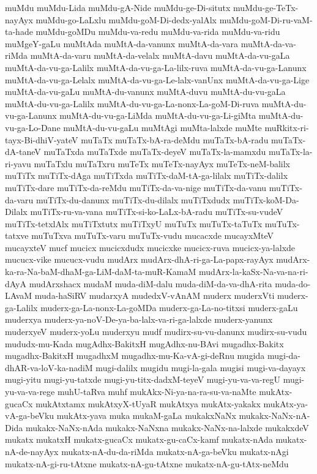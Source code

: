 {muMdu
muMdu-Lida
muMdu-gA-Nide
muMdu-ge-Di-situtx
muMdu-ge-TeTx-nayAyx
muMdu-go-LaLxlu
muMdu-goM-Di-dedx-yalAlx
muMdu-goM-Di-ru-vaM-ta-hade
muMdu-goMDu
muMdu-va-redu
muMdu-va-rida
muMdu-va-ridu
muMgeY-gaLu
muMtAda
muMtA-da-vanunx
muMtA-da-vara
muMtA-da-va-riMda
muMtA-da-varu
muMtA-da-velalx
muMtA-davu
muMtA-da-vu-gaLa
muMtA-da-vu-ga-Lalilx
muMtA-da-vu-ga-La-lilx-ruva
muMtA-da-vu-ga-Lanunx
muMtA-da-vu-ga-Lelalx
muMtA-da-vu-ga-Le-lalx-vanUnx
muMtA-da-vu-ga-Lige
muMtA-da-vu-gaLu
muMtA-du-vanunx
muMtA-duvu
muMtA-du-vu-gaLa
muMtA-du-vu-ga-Lalilx
muMtA-du-vu-ga-La-nonx-La-goM-Di-ruva
muMtA-du-vu-ga-Lanunx
muMtA-du-vu-ga-LiMda
muMtA-du-vu-ga-Li-giMta
muMtA-du-vu-ga-Lo-Dane
muMtA-du-vu-gaLu
muMtAgi
muMta-lalxde
muMte
muRkitx-ri-tayx-Bi-dhiV-yateV
muTaTx
muTaTx-bA-ra-deMdu
muTaTx-bA-radu
muTaTx-dA-taneV
muTaTxda
muTaTxde
muTaTx-deyeV
muTaTx-la-mamxdu
muTaTx-la-ri-yavu
muTaTxlu
muTaTxru
muTeTx
muTeTx-nayAyx
muTeTx-neM-balilx
muTiTx
muTiTx-dAga
muTiTxda
muTiTx-daM-tA-ga-lilalx
muTiTx-dalilx
muTiTx-dare
muTiTx-da-reMdu
muTiTx-da-va-nige
muTiTx-da-vanu
muTiTx-da-varu
muTiTx-du-danunx
muTiTx-du-dilalx
muTiTxdudx
muTiTx-koM-Da-Dilalx
muTiTx-ru-va-vana
muTiTx-si-ko-LaLx-bA-radu
muTiTx-su-vudeV
muTiTx-tetxlAlx
muTiTxtutx
muTiTxyU
muTuTx
muTuTx-taTuTx
muTuTx-tatxve
muTuTxva
muTuTx-varu
muTuTx-vudu
mucacxde
mucayxMteV
mucayxteV
mucf
mucicx
mucicxdudx
mucicxke
mucicx-ruva
mucicx-ya-lalxde
mucucx-vike
mucucx-vudu
mudArx
mudArx-dhA-ri-ga-La-papx-rayAyx
mudArx-ka-ra-Na-baM-dhaM-ga-LiM-daM-ta-muR-KamaM
mudArx-la-kaSx-Na-va-na-ri-dAyA
mudArxshacx
mudaM
muda-diM-dalu
muda-diM-da-va-dhA-rita
muda-do-LAvaM
muda-haSiRV
mudarxyA
mudedxV-vAnAM
muderx
muderxVti
muderx-ga-Lalilx
muderx-ga-La-nonx-La-goMDa
muderx-ga-La-no-titxsi
muderx-gaLu
muderxya
muderx-ya-noV-De-ya-ba-lalx-va-ri-ga-lalxde
muderx-yanunx
muderxyeV
muderx-yoLu
muderxyu
mudf
mudirx-su-vu-danunx
mudirx-su-vudu
mududx-mu-Kada
mugAdhx-BakitxH
mugAdhx-nu-BAvi
mugadhx-Bakitx
mugadhx-BakitxH
mugadhxM
mugadhx-mu-Ka-vA-gi-deRnu
mugida
mugi-da-dhAR-va-loV-ka-nadiM
mugi-dalilx
mugidu
mugi-la-gala
mugisi
mugi-va-dayayx
mugi-yitu
mugi-yu-tatxde
mugi-yu-titx-dadxM-teyeV
mugi-yu-va-va-regU
mugi-yu-va-va-rege
muhU-taRva
muhf
mukAkx-Ni-ya-na-ra-su-va-naMte
mukAtx-gucaCx
mukAtxtamx
mukAtxyX-tUyaR
mukAtxya
mukAtx-yakakx
mukAtx-ya-vA-ga-beVku
mukAtx-yava
muka
mukaM-gaLa
mukakxNaNx
mukakx-NaNx-nA-Dida
mukakx-NaNx-nAda
mukakx-NaNxna
mukakx-NaNx-na-lalxde
mukakxdeV
mukatx
mukatxH
mukatx-gucaCx
mukatx-gu-caCx-kamf
mukatx-nAda
mukatx-nA-de-nayAyx
mukatx-nA-du-da-riMda
mukatx-nA-ga-beVku
mukatx-nAgi
mukatx-nA-gi-ru-tAtxne
mukatx-nA-gu-tAtxne
mukatx-nA-gu-tAtx-neMdu
}
